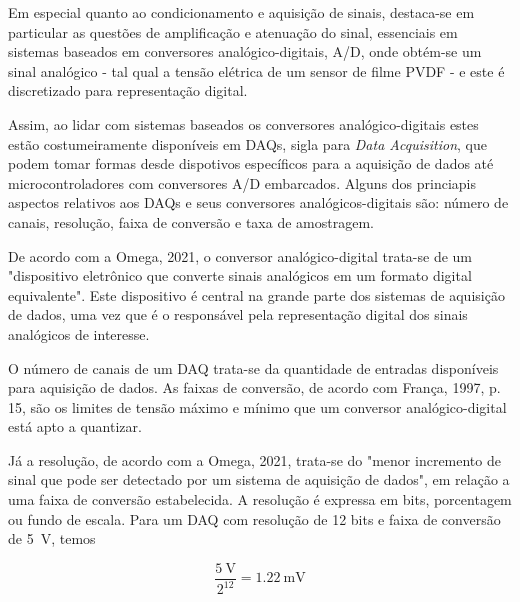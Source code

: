 \documentclass[
	12pt,				
	oneside,			
	a4paper,			
	english,			
	brazil,			
	]{abntex2ppgsi}
\begin{document}
Em especial quanto ao condicionamento e aquisição de sinais, destaca-se em particular as questões de amplificação e atenuação do sinal, essenciais em sistemas baseados em conversores analógico-digitais, A/D, onde obtém-se um sinal analógico - tal qual a tensão elétrica de um sensor de filme PVDF - e este é discretizado para representação digital. 

Assim, ao lidar com sistemas baseados os conversores analógico-digitais estes estão costumeiramente disponíveis em DAQs, sigla para \textit{Data Acquisition}, que podem tomar formas desde dispotivos específicos para a aquisição de dados até microcontroladores com conversores A/D embarcados. Alguns dos princiapis aspectos relativos aos DAQs e seus conversores analógicos-digitais são: número de canais, resolução, faixa de conversão e taxa de amostragem.

De acordo com a Omega, 2021, o conversor analógico-digital trata-se de um "dispositivo eletrônico que converte sinais analógicos em um formato digital equivalente". Este dispositivo é central na grande parte dos sistemas de aquisição de dados, uma vez que é o responsável pela representação digital dos sinais analógicos de interesse. 


O número de canais de um DAQ trata-se da quantidade de entradas disponíveis para aquisição de dados. As faixas de conversão, de acordo com França, 1997, p. 15, são os limites de tensão máximo e mínimo que um conversor analógico-digital está apto a quantizar.

Já a resolução, de acordo com a Omega, 2021, trata-se do "menor incremento de sinal que pode ser detectado por um sistema de aquisição de dados", em relação a uma faixa de conversão estabelecida. A resolução é expressa em bits, porcentagem ou fundo de escala. Para um DAQ com resolução de 12 bits e faixa de conversão de \SI{5}{\volt}, temos 

\begin{equation}
	\frac{\SI{5}{\volt}}{2^{12}} = \SI{1,22}{\milli\volt}
	\label{eq: Resolução de DAQ de 12 bits com faixa de conversão de 5 volts}
\end{equation}

\end{document}
